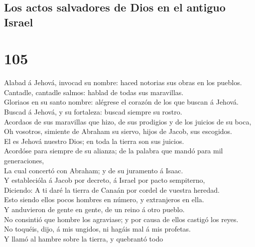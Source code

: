 \hypertarget{los-actos-salvadores-de-dios-en-el-antiguo-israel}{%
\subsection{Los actos salvadores de Dios en el antiguo
Israel}\label{los-actos-salvadores-de-dios-en-el-antiguo-israel}}

\hypertarget{section-104}{%
\section{105}\label{section-104}}

 Alabad á Jehová, invocad su nombre: haced notorias sus
obras en los pueblos.\\
 Cantadle, cantadle salmos: hablad de todas sus
maravillas.\\
 Gloriaos en su santo nombre: alégrese el corazón de los
que buscan á Jehová.\\
 Buscad á Jehová, y su fortaleza: buscad siempre su
rostro.\\
 Acordaos de sus maravillas que hizo, de sus prodigios y
de los juicios de su boca,\\
 Oh vosotros, simiente de Abraham su siervo, hijos de
Jacob, sus escogidos.\\
 El es Jehová nuestro Dios; en toda la tierra son sus
juicios.\\
 Acordóse para siempre de su alianza; de la palabra que
mandó para mil generaciones,\\
 La cual concertó con Abraham; y de su juramento á
Isaac.\\
 Y establecióla á Jacob por decreto, á Israel por pacto
sempiterno,\\
 Diciendo: A ti daré la tierra de Canaán por cordel de
vuestra heredad.\\
 Esto siendo ellos pocos hombres en número, y extranjeros
en ella.\\
 Y anduvieron de gente en gente, de un reino á otro
pueblo.\\
 No consintió que hombre los agraviase; y por causa de
ellos castigó los reyes.\\
 No toquéis, dijo, á mis ungidos, ni hagáis mal á mis
profetas.\\
 Y llamó al hambre sobre la tierra, y quebrantó todo
